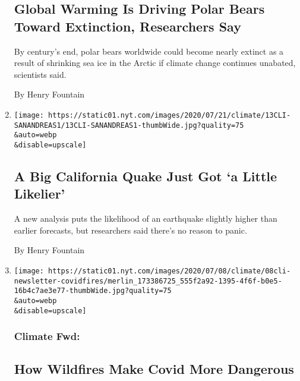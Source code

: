 \begin{enumerate}
{  \subsection{Global Warming Is Driving Polar Bears Toward Extinction,
  Researchers
  Say}\label{global-warming-is-driving-polar-bears-toward-extinction-researchers-say}}

  By century's end, polar bears worldwide could become nearly extinct as
  a result of shrinking sea ice in the Arctic if climate change
  continues unabated, scientists said.

  By Henry Fountain
\item
  \href{/2020/07/13/climate/california-san-andreas-fault-earthquake.html}{}

  \texttt{[image: https://static01.nyt.com/images/2020/07/21/climate/13CLI-SANANDREAS1/13CLI-SANANDREAS1-thumbWide.jpg?quality=75\\\&auto=webp\\\&disable=upscale]}

  \hypertarget{a-big-california-quake-just-got-a-little-likelier}{%
  \subsection{A Big California Quake Just Got `a Little
  Likelier'}\label{a-big-california-quake-just-got-a-little-likelier}}

  A new analysis puts the likelihood of an earthquake slightly higher
  than earlier forecasts, but researchers said there's no reason to
  panic.

  By Henry Fountain
\item
  \href{/2020/07/08/climate/wildfires-smoke-covid-coronavirus.html}{}

  \texttt{[image: https://static01.nyt.com/images/2020/07/08/climate/08cli-newsletter-covidfires/merlin\_173386725\_555f2a92-1395-4f6f-b0e5-16b4c7ae3e77-thumbWide.jpg?quality=75\\\&auto=webp\\\&disable=upscale]}

  \hypertarget{climate-fwd}{%
  \subsubsection{Climate Fwd:}\label{climate-fwd}}

  \hypertarget{how-wildfires-make-covid-more-dangerous}{%
  \subsection{How Wildfires Make Covid More
  Dangerous}\label{how-wildfires-make-covid-more-dangerous}}


\end{enumerate}
